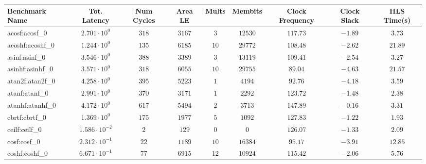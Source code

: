 \begin{tabular}{|l|c|c|c|c|c|c|c|c|}
\hline
Benchmark Name               & Tot. Latency            & Num Cycles & Area LE    & Mults   & Membits    & Clock Frequency & Clock Slack & HLS Time(s) \\
\hline
acosf:acosf\_0               & $ 2.701 \cdot 10^{0}  $ & $ 318    $ & $ 3167   $ & $ 3   $ & $ 12530  $ & $ 117.73      $ & $ -1.89   $ & $ 3.73    $ \\
acoshf:acoshf\_0             & $ 1.244 \cdot 10^{0}  $ & $ 135    $ & $ 6185   $ & $ 10  $ & $ 29772  $ & $ 108.48      $ & $ -2.62   $ & $ 21.89   $ \\
asinf:asinf\_0               & $ 3.546 \cdot 10^{0}  $ & $ 388    $ & $ 3389   $ & $ 3   $ & $ 13119  $ & $ 109.41      $ & $ -2.54   $ & $ 3.27    $ \\
asinhf:asinhf\_0             & $ 3.571 \cdot 10^{0}  $ & $ 318    $ & $ 6055   $ & $ 10  $ & $ 29755  $ & $ 89.04       $ & $ -4.63   $ & $ 21.57   $ \\
atan2f:atan2f\_0             & $ 4.258 \cdot 10^{0}  $ & $ 395    $ & $ 5223   $ & $ 1   $ & $ 4194   $ & $ 92.76       $ & $ -4.18   $ & $ 3.59    $ \\
atanf:atanf\_0               & $ 2.991 \cdot 10^{0}  $ & $ 370    $ & $ 3171   $ & $ 1   $ & $ 2292   $ & $ 123.72      $ & $ -1.48   $ & $ 2.38    $ \\
atanhf:atanhf\_0             & $ 4.172 \cdot 10^{0}  $ & $ 617    $ & $ 5494   $ & $ 2   $ & $ 3713   $ & $ 147.89      $ & $ -0.16   $ & $ 3.31    $ \\
cbrtf:cbrtf\_0               & $ 1.369 \cdot 10^{0}  $ & $ 175    $ & $ 1977   $ & $ 5   $ & $ 1092   $ & $ 127.83      $ & $ -1.22   $ & $ 1.93    $ \\
ceilf:ceilf\_0               & $ 1.586 \cdot 10^{-2} $ & $ 2      $ & $ 129    $ & $ 0   $ & $ 0      $ & $ 126.07      $ & $ -1.33   $ & $ 2.09    $ \\
cosf:cosf\_0                 & $ 2.312 \cdot 10^{-1} $ & $ 22     $ & $ 1189   $ & $ 10  $ & $ 16384  $ & $ 95.17       $ & $ -3.91   $ & $ 12.85   $ \\
coshf:coshf\_0               & $ 6.671 \cdot 10^{-1} $ & $ 77     $ & $ 6915   $ & $ 12  $ & $ 10924  $ & $ 115.42      $ & $ -2.06   $ & $ 5.76    $ \\

\end{tabular}
